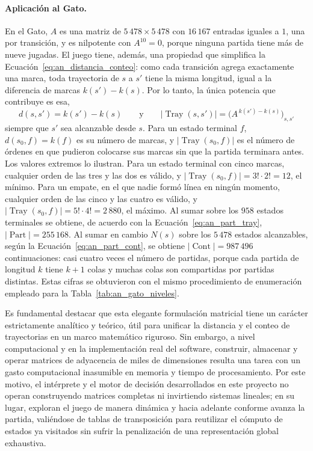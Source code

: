 \paragraph{Aplicación al Gato.} En el Gato, $A$ es una matriz de $5\,478 \times 5\,478$ con $16\,167$ entradas iguales a $1$, una por transición, y es nilpotente con $A^{10} = 0$, porque ninguna partida tiene más de nueve jugadas. El juego tiene, además, una propiedad que simplifica la Ecuación~\eqref{eq:an_distancia_conteo}: como cada transición agrega exactamente una marca, toda trayectoria de $s$ a $s'$ tiene la misma longitud, igual a la diferencia de marcas $k(s') - k(s)$. Por lo tanto, la única potencia que contribuye es esa,
\begin{equation}
    d(s, s') = k(s') - k(s)
    \qquad\text{y}\qquad
    |\operatorname{Tray}(s, s')| = \big(A^{\,k(s') - k(s)}\big)_{s,s'}
    \label{eq:an_gato_tray}
\end{equation}
siempre que $s'$ sea alcanzable desde $s$. Para un estado terminal $f$, $d(s_0, f) = k(f)$ es su número de marcas, y $|\operatorname{Tray}(s_0, f)|$ es el número de órdenes en que pudieron colocarse sus marcas sin que la partida terminara antes. Los valores extremos lo ilustran. Para un estado terminal con cinco marcas, cualquier orden de las tres  y las dos  es válido, y $|\operatorname{Tray}(s_0, f)| = 3! \cdot 2! = 12$, el mínimo. Para un empate, en el que nadie formó línea en ningún momento, cualquier orden de las cinco  y las cuatro  es válido, y $|\operatorname{Tray}(s_0, f)| = 5! \cdot 4! = 2\,880$, el máximo. Al sumar sobre los $958$ estados terminales se obtiene, de acuerdo con la Ecuación~\eqref{eq:an_part_tray}, $|\operatorname{Part}| = 255\,168$. Al sumar en cambio $N(s)$ sobre los $5\,478$ estados alcanzables, según la Ecuación~\eqref{eq:an_part_cont}, se obtiene $|\operatorname{Cont}| = 987\,496$ continuaciones: casi cuatro veces el número de partidas, porque cada partida de longitud $k$ tiene $k+1$ colas y muchas colas son compartidas por partidas distintas. Estas cifras se obtuvieron con el mismo procedimiento de enumeración empleado para la Tabla~\ref{tab:an_gato_niveles}.

Es fundamental destacar que esta elegante formulación matricial tiene un carácter estrictamente analítico y teórico, útil para unificar la distancia y el conteo de trayectorias en un marco matemático riguroso. Sin embargo, a nivel computacional y en la implementación real del software, construir, almacenar y operar matrices de adyacencia de miles de dimensiones resulta una tarea con un gasto computacional inasumible en memoria y tiempo de procesamiento. Por este motivo, el intérprete y el motor de decisión desarrollados en este proyecto no operan construyendo matrices completas ni invirtiendo sistemas lineales; en su lugar, exploran el juego de manera dinámica y hacia adelante conforme avanza la partida, valiéndose de tablas de transposición para reutilizar el cómputo de estados ya visitados sin sufrir la penalización de una representación global exhaustiva.

